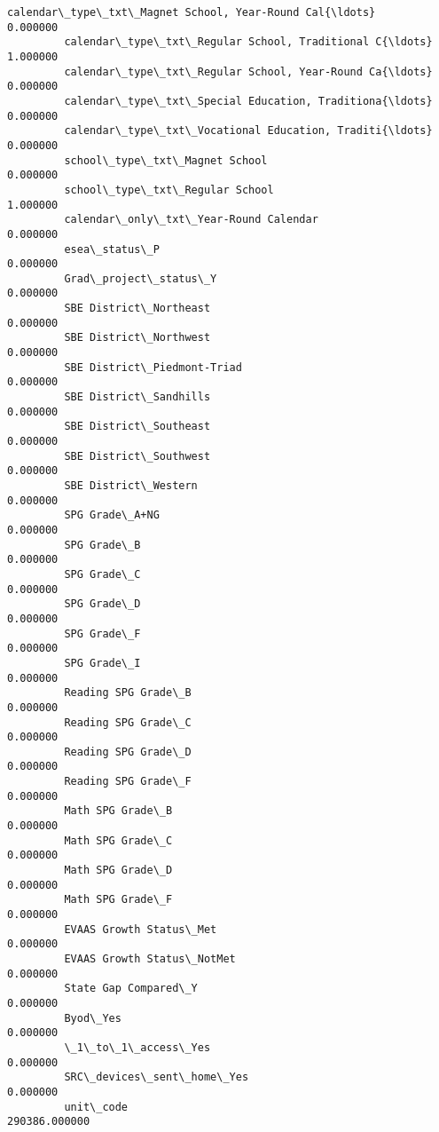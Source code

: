 \documentclass[11pt]{article}
\begin{document}
\begin{Verbatim}[commandchars=\\\{\}]
         calendar\_type\_txt\_Magnet School, Year-Round Cal{\ldots}       0.000000   
         calendar\_type\_txt\_Regular School, Traditional C{\ldots}       1.000000   
         calendar\_type\_txt\_Regular School, Year-Round Ca{\ldots}       0.000000   
         calendar\_type\_txt\_Special Education, Traditiona{\ldots}       0.000000   
         calendar\_type\_txt\_Vocational Education, Traditi{\ldots}       0.000000   
         school\_type\_txt\_Magnet School                            0.000000   
         school\_type\_txt\_Regular School                           1.000000   
         calendar\_only\_txt\_Year-Round Calendar                    0.000000   
         esea\_status\_P                                            0.000000   
         Grad\_project\_status\_Y                                    0.000000   
         SBE District\_Northeast                                   0.000000   
         SBE District\_Northwest                                   0.000000   
         SBE District\_Piedmont-Triad                              0.000000   
         SBE District\_Sandhills                                   0.000000   
         SBE District\_Southeast                                   0.000000   
         SBE District\_Southwest                                   0.000000   
         SBE District\_Western                                     0.000000   
         SPG Grade\_A+NG                                           0.000000   
         SPG Grade\_B                                              0.000000   
         SPG Grade\_C                                              0.000000   
         SPG Grade\_D                                              0.000000   
         SPG Grade\_F                                              0.000000   
         SPG Grade\_I                                              0.000000   
         Reading SPG Grade\_B                                      0.000000   
         Reading SPG Grade\_C                                      0.000000   
         Reading SPG Grade\_D                                      0.000000   
         Reading SPG Grade\_F                                      0.000000   
         Math SPG Grade\_B                                         0.000000   
         Math SPG Grade\_C                                         0.000000   
         Math SPG Grade\_D                                         0.000000   
         Math SPG Grade\_F                                         0.000000   
         EVAAS Growth Status\_Met                                  0.000000   
         EVAAS Growth Status\_NotMet                               0.000000   
         State Gap Compared\_Y                                     0.000000   
         Byod\_Yes                                                 0.000000   
         \_1\_to\_1\_access\_Yes                                       0.000000   
         SRC\_devices\_sent\_home\_Yes                                0.000000   
         unit\_code                                           290386.000000   
         

\end{Verbatim}
\end{document}
